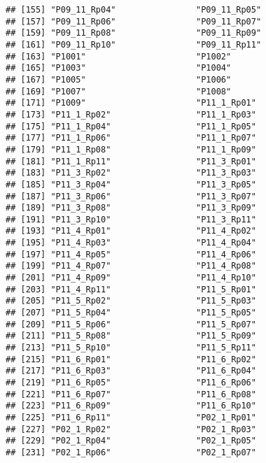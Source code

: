 \documentclass[
]{article}
\begin{document}
\begin{verbatim}
## [155] "P09_11_Rp04"                "P09_11_Rp05"               
## [157] "P09_11_Rp06"                "P09_11_Rp07"               
## [159] "P09_11_Rp08"                "P09_11_Rp09"               
## [161] "P09_11_Rp10"                "P09_11_Rp11"               
## [163] "P1001"                      "P1002"                     
## [165] "P1003"                      "P1004"                     
## [167] "P1005"                      "P1006"                     
## [169] "P1007"                      "P1008"                     
## [171] "P1009"                      "P11_1_Rp01"                
## [173] "P11_1_Rp02"                 "P11_1_Rp03"                
## [175] "P11_1_Rp04"                 "P11_1_Rp05"                
## [177] "P11_1_Rp06"                 "P11_1_Rp07"                
## [179] "P11_1_Rp08"                 "P11_1_Rp09"                
## [181] "P11_1_Rp11"                 "P11_3_Rp01"                
## [183] "P11_3_Rp02"                 "P11_3_Rp03"                
## [185] "P11_3_Rp04"                 "P11_3_Rp05"                
## [187] "P11_3_Rp06"                 "P11_3_Rp07"                
## [189] "P11_3_Rp08"                 "P11_3_Rp09"                
## [191] "P11_3_Rp10"                 "P11_3_Rp11"                
## [193] "P11_4_Rp01"                 "P11_4_Rp02"                
## [195] "P11_4_Rp03"                 "P11_4_Rp04"                
## [197] "P11_4_Rp05"                 "P11_4_Rp06"                
## [199] "P11_4_Rp07"                 "P11_4_Rp08"                
## [201] "P11_4_Rp09"                 "P11_4_Rp10"                
## [203] "P11_4_Rp11"                 "P11_5_Rp01"                
## [205] "P11_5_Rp02"                 "P11_5_Rp03"                
## [207] "P11_5_Rp04"                 "P11_5_Rp05"                
## [209] "P11_5_Rp06"                 "P11_5_Rp07"                
## [211] "P11_5_Rp08"                 "P11_5_Rp09"                
## [213] "P11_5_Rp10"                 "P11_5_Rp11"                
## [215] "P11_6_Rp01"                 "P11_6_Rp02"                
## [217] "P11_6_Rp03"                 "P11_6_Rp04"                
## [219] "P11_6_Rp05"                 "P11_6_Rp06"                
## [221] "P11_6_Rp07"                 "P11_6_Rp08"                
## [223] "P11_6_Rp09"                 "P11_6_Rp10"                
## [225] "P11_6_Rp11"                 "P02_1_Rp01"                
## [227] "P02_1_Rp02"                 "P02_1_Rp03"                
## [229] "P02_1_Rp04"                 "P02_1_Rp05"                
## [231] "P02_1_Rp06"                 "P02_1_Rp07"                

\end{verbatim}
\end{document}
